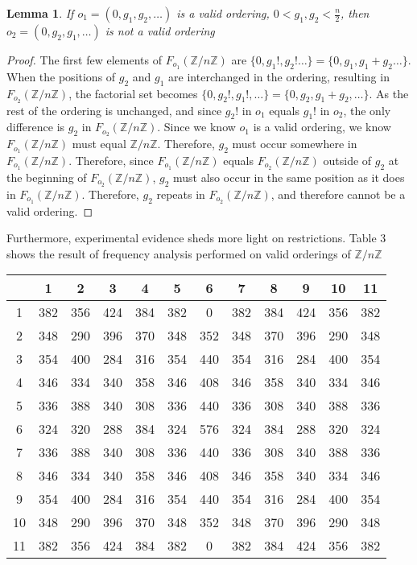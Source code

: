 \documentclass{article}
\newcommand{\ZZ}{\mathbb{Z}}
\newcommand{\ZnZ}{\ZZ/n\ZZ}
\newtheorem{lemma}{Lemma}
\begin{document}
\begin{lemma}
If $o_1 = (0, g_1, g_2, \ldots)$ is a valid ordering, $0<g_1,g_2<\frac{n}{2}$, then $o_2 = (0,g_2, g_1, \ldots)$ is not a valid ordering
\end{lemma}
\begin{proof}
The first few elements of $F_{o_1}(\ZnZ)$ are $\{0,g_1!, g_2!\ldots\} = \{0,g_1,g_1+g_2\ldots\}$. When the positions of $g_2$ and $g_1$ are interchanged in the ordering, resulting in $F_{o_2}(\ZnZ)$, the factorial set becomes $\{0,g_2!,g_1!,\ldots\} = \{0,g_2,g_1+g_2,\ldots\}$. As the rest of the ordering is unchanged, and since $g_2!$ in $o_1$ equals $g_1!$ in $o_2$, the only difference is $g_2$ in $F_{o_2}(\ZnZ)$. Since we know $o_1$ is a valid ordering, we know $F_{o_1}(\ZnZ)$ must equal $\ZnZ$. Therefore, $g_2$ must occur somewhere in $F_{o_1}(\ZnZ)$. Therefore, since $F_{o_1}(\ZnZ)$ equals $F_{o_2}(\ZnZ)$ outside of $g_2$ at the beginning of $F_{o_2}(\ZnZ)$, $g_2$ must also occur in the same position as it does in $F_{o_1}(\ZnZ)$. Therefore, $g_2$ repeats in $F_{o_2}(\ZnZ)$, and therefore cannot be a valid ordering.
\end{proof}


Furthermore, experimental evidence sheds more light on restrictions. Table 3 shows the result of frequency analysis performed on valid orderings of $\ZnZ$

\begin{center}

\begin{tabular}{|c|c|c|c|c|c|c|c|c|c|c|c|}
\hline
 &1 & 2 & 3 & 4 & 5 & 6 &7&8&9&10&11 \\
 \hline
  1 &   382& 356& 424& 384& 382& 0& 382& 384& 424& 356& 382\\
 2 &   348& 290& 396& 370& 348& 352& 348& 370& 396& 290& 348\\
 3 &   354& 400& 284& 316& 354& 440& 354& 316& 284& 400& 354\\
 4 &   346& 334& 340& 358& 346& 408& 346& 358& 340& 334& 346\\
 5 &   336& 388& 340& 308& 336& 440& 336& 308& 340& 388& 336\\
 6 &   324& 320& 288& 384& 324& 576& 324& 384& 288& 320& 324\\
 7 &   336& 388& 340& 308& 336& 440& 336& 308& 340& 388& 336\\
 8 &   346& 334& 340& 358& 346& 408& 346& 358& 340& 334& 346\\
 9 &  354& 400& 284& 316& 354& 440& 354& 316& 284& 400& 354\\
 10 & 348& 290& 396& 370& 348& 352& 348& 370& 396& 290& 348\\
 11&  382& 356& 424& 384& 382& 0& 382& 384& 424& 356& 382\\
 \hline
\end{tabular}

\end{center}
\end{document}
